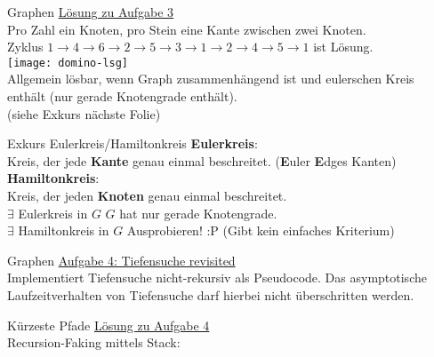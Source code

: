 \begin{frame}{Graphen}
	\underline{Lösung zu Aufgabe 3} \\
	Pro Zahl ein Knoten, pro Stein eine Kante zwischen zwei Knoten. \\
	Zyklus $1 \rightarrow 4 \rightarrow 6 \rightarrow 2 \rightarrow 5 \rightarrow 3 \rightarrow 1 \rightarrow 2 \rightarrow 4 \rightarrow 5 \rightarrow 1$ ist Lösung. \\
	\texttt{[image: domino-lsg]} \\
	\pause
	Allgemein lösbar, wenn Graph zusammenhängend ist und eulerschen Kreis enthält (\gdw nur gerade Knotengrade enthält). \\
	{\small (siehe Exkurs nächste Folie)}
\end{frame}

\begin{frame}{Exkurs Eulerkreis/Hamiltonkreis}
	\textbf{Eulerkreis}: \\
	Kreis, der jede \textbf{Kante} genau einmal beschreitet. {\small (\textbf{E}uler \impl \textbf{E}dges \impl Kanten)} \\
	\forcenewline
	\pause
	\textbf{Hamiltonkreis}: \\
	Kreis, der jeden \textbf{Knoten} genau einmal beschreitet. \\
	\forcenewline
	\pause
	$\exists$ Eulerkreis in $G$ \gdw $G$ hat nur gerade Knotengrade. \\
	$\exists$ Hamiltonkreis in $G$ \gdw Ausprobieren! :P (Gibt kein einfaches Kriterium)
\end{frame}


\begin{frame}{Graphen}
	\underline{Aufgabe 4: Tiefensuche revisited} \\
	Implementiert Tiefensuche nicht-rekursiv als Pseudocode. Das asymptotische Laufzeitverhalten von Tiefensuche darf hierbei nicht überschritten werden.
\end{frame}

\begin{frame}{Kürzeste Pfade}
	\underline{Lösung zu Aufgabe 4} \\
	Recursion-Faking mittels Stack: 
	\begin{algorithm}[H]
	\end{algorithm}
\end{frame}


